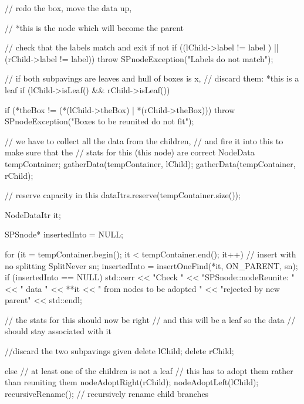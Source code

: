 \begin{DoxyCode}
    {
        // redo the box, move the data up,

        // *this is the node which will become the parent

        // check that the labels match and exit if not
        if ((lChild->label != label ) || (rChild->label != label)) {
            throw SPnodeException("Labels do not match");
        }

        // if both subpavings are leaves and hull of boxes is x,
        // discard them: *this is a leaf
        if (lChild->isLeaf() && rChild->isLeaf()) {
            if (*theBox !=
                (*(lChild->theBox) | *(rChild->theBox))) {
                throw SPnodeException("Boxes to be reunited do not fit");
            }

            // we have to collect all the data from the children,
            // and fire it into this to make sure that the
            // stats for this (this node) are correct
            NodeData tempContainer;
            gatherData(tempContainer, lChild);
            gatherData(tempContainer, rChild);

            // reserve capacity in this
            dataItrs.reserve(tempContainer.size());

            NodeDataItr it;

            SPSnode* insertedInto = NULL;

            for (it = tempContainer.begin();
                it < tempContainer.end(); it++) {
                // insert with no splitting
                SplitNever sn;
                insertedInto = insertOneFind(*it, ON_PARENT, sn);
                if (insertedInto == NULL) {
                    std::cerr << "Check "
                        << "SPSnode::nodeReunite: "
                        << " data " << **it
                        << " from nodes to be adopted "
                        << "rejected by new parent"
                        << std::endl;
                }
            }

            // the stats for this should now be right
            // and this will be a leaf so the data
            // should stay associated with it

            //discard the two subpavings given
            delete lChild;
            delete rChild;

        }

        else {  // at least one of the children is not a leaf
            // this has to adopt them rather than reuniting them
            nodeAdoptRight(rChild);
            nodeAdoptLeft(lChild);
            recursiveRename(); // recursively rename child branches
        }
    }
\end{DoxyCode}
